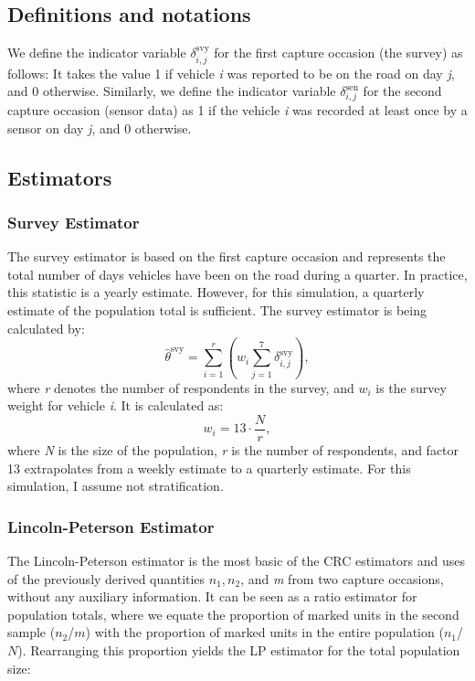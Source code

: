 \documentclass[12pt, a4paper]{article}
\begin{document}
\subsection{Definitions and notations}
We define the indicator variable $\delta_{i,j}^{\text{svy}}$ for the first capture occasion (the survey) as follows: It takes the value 1 if vehicle \textit{i} was reported to be on the road on day \textit{j}, and 0 otherwise. Similarly, we define the indicator variable $\delta_{i,j}^{\text{sen}}$ for the second capture occasion (sensor data) as 1 if the vehicle \textit{i} was recorded at least once by a sensor on day \textit{j}, and 0 otherwise. 

\subsection{Estimators}

\subsubsection*{Survey Estimator}
\noindent The survey estimator is based on the first capture occasion and represents the total number of days vehicles have been on the road during a quarter. In practice, this statistic is a yearly estimate. However, for this simulation, a quarterly estimate of the population total is sufficient. The survey estimator is being calculated by:
$$\hat{\theta}^{\text{svy}} = \sum_{i=1}^{r} \left(w_{i} \sum_{j=1}^{7} \delta_{i,j}^{\text{svy}} \right) ,$$
where \textit{r} denotes the number of respondents in the survey, and \textit{$w_{i}$} is the survey weight for vehicle \textit{i}. It is calculated as:
$$w_{i} = 13 \cdot \frac{N}{r}, $$
where \textit{N} is the size of the population, \textit{r} is the number of respondents, and factor 13 extrapolates from a weekly estimate to a quarterly estimate. For this simulation, I assume not stratification.

\subsubsection*{Lincoln-Peterson Estimator}
\noindent The Lincoln-Peterson estimator \parencite{lincoln1930calculating, petersen1896yearly} is the most basic of the CRC estimators and uses of the previously derived quantities $n_{1}, n_{2}$, and \textit{m} from two capture occasions, without any auxiliary information. It can be seen as a ratio estimator for population totals, where we equate the proportion of marked units in the second sample ($n_2$/$m$) with the proportion of marked units in the entire population ($n_1$/$N$). Rearranging this proportion yields the LP estimator for the total population size: 
\end{document}
